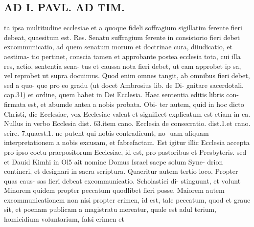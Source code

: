 \documentclass{article}
\begin{document}
\begin{pages}
\section*{AD I. PAVL. AD TIM. }
\marginpar{[ p.334 ]}ta ipsa multitudine ecclesiae et a quoque fideli soffragium sigillatim ferente fieri debeat, quaesitum est. Res. Senatu suffragium ferente in consistorio fieri debet excommunicatio, ad quem senatum morum et doctrinae cura, diiudicatio, et aestima- tio pertinet, conscia tamen et approbante postea ecclesia tota, cui illa res, actio, sententia sena- tus et caussa nota fieri debet, ut eam approbet ip sa, vel reprobet ut supra docuimus. Quod enim omnes tangit, ab omnibus fieri debet, sed a quo- que pro eo gradu (ut docet Ambrosius lib. de Di- gnitare sacerdotali. cap.31) et ordine, quem habet in Dei Ecclesia. Haec sententia editis libris con- firmata est, et abumde antea a nobis probata. Obi- ter autem, quid in hoc dicto Christi, dic Ecclesiae, vox Ecclesiae valeat et significet explicatum est etiam in ca. Nullus in verbo Ecclesia dist. 63.item cano. Ecclesia de consecratio. dist.1.et cano. scire. 7.quaest.1. ne putent qui nobis contradicunt, no- uam aliquam interpretationem a nobis excusam, et fabrefactam. Est igitur illic Ecclesia accepta pro ipso coetu praepositorum Ecclesiae, id est, pro pastoribus et Presbyteris. sed et Dauid Kimhi in Ol5 ait nomine Domus Israel saepe solum Syne- drion contineri, et designari in sacra scriptura. Quaeritur autem tertio loco. Propter quas caus- sas fieri debeat excommunicatio. Scholastici di- stinguunt, et volunt Minorem quidem propter peccatum quodlibet fieri posse. Maiorem autem excommunicationem non nisi propter crimen, id est, tale peccatum, quod et graue sit, et poenam publicam a magistratu mereatur, quale est adul terium, homicidium voluntarium, falsi crimen et 

\end{pages}
\end{document}
